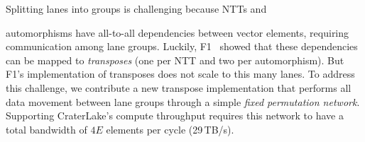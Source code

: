 Splitting lanes into groups is challenging because NTTs and

\noindent automorphisms have all-to-all dependencies between vector elements,
requiring communication among lane groups. Luckily,
F1~\cite{feldmann:micro21:f1} showed that these dependencies can be mapped to
\emph{transposes} (one per NTT and two per automorphism). But F1's
implementation of transposes does not scale to this many lanes. To address this
challenge, we contribute a new transpose implementation that performs all data
movement between lane groups through a simple \emph{fixed permutation network}.
Supporting CraterLake's compute throughput requires this network to have a total
bandwidth of $4E$ elements per cycle (29\,TB/s).

